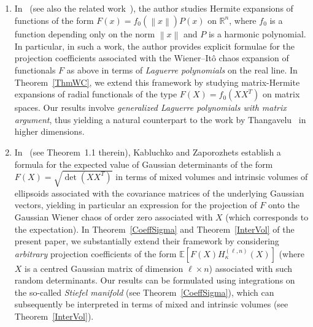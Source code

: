 \documentclass[AHL,Unicode,longabstracts,published]{cedram}
\newcommand{\R}{\mathbb{R}}
\newcommand{\norm}[1]{\left\lVert#1\right\rVert}
\newcommand*{\alphenumi}{\renewcommand*{\theenumi}{\alph{enumi}}}
\begin{document}
\begin{enumerate}\alphenumi
\item In~\cite{Thangavelu} (see also the related work~\cite{Kochneff}), the author studies Hermite expansions of functions of the form $F(x)=f_0(\norm{x})P(x)$ on $\R^n$, where $f_0$ is a function depending only on the norm $\norm{x}$ and $P$ is a harmonic polynomial. In particular, in such a work, the author provides explicit formulae for the projection coefficients associated with the Wiener--Itô chaos expansion of functionals $F$ as above in terms of \emph{Laguerre polynomials} on the real line. In Theorem~\ref{ThmWC}, we extend this framework by studying matrix-Hermite expansions of radial functionals of the type $F(X) = f_0(XX^T)$ on matrix spaces. Our results involve \emph{generalized Laguerre polynomials with matrix argument}, thus yielding a natural counterpart to the work by Thangavelu~\cite{Thangavelu} in higher dimensions.
\item In~\cite{Kab14} (see Theorem~1.1 therein), Kabluchko and Zaporozhets establish a formula for the expected value of Gaussian determinants of the form $F(X) = \sqrt{\det(XX^T)}$ in terms of mixed volumes and intrinsic volumes of ellipsoids associated with the covariance matrices of the underlying Gaussian vectors, yielding in particular an expression for the projection of $F$ onto the Gaussian Wiener chaos of order zero associated with $X$ (which corresponds to the expectation). In Theorem~\ref{CoeffSigma} and Theorem~\ref{InterVol} of the present paper, we substantially extend their framework by considering \emph{arbitrary} projection coefficients of the form $\mathbb{E}[F(X) H_{\kappa}^{(\ell,n)}(X)]$ (where $X$ is a centred Gaussian matrix of dimension $\ell \times n$) associated with such random determinants. Our results can be formulated using integrations on the so-called \emph{Stiefel manifold} (see Theorem~\ref{CoeffSigma}), which can subsequently be interpreted in terms of mixed and intrinsic volumes (see Theorem~\ref{InterVol}).


\end{enumerate}
\end{document}
